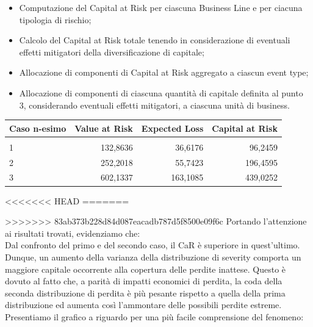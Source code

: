 \documentclass[titlepage]{article}
\begin{document}
\begin{itemize}
\begin{itemize}
	\item 	Computazione del Capital at Risk per ciascuna Business Line e per ciacuna tipologia di rischio;
	\item Calcolo del Capital at Risk totale tenendo in considerazione di eventuali effetti mitigatori della diversificazione di capitale;
	\item 	Allocazione di componenti di Capital at Risk aggregato a ciascun event type;
	\item 	Allocazione di componenti di ciascuna quantità di capitale definita al punto 3, considerando eventuali effetti mitigatori, a ciascuna unità di business.
\end{itemize}
\begin{table}[htbp]
	\centering
	\begin{tabular}{l|rrr}
		Caso n-esimo & Value at Risk & Expected Loss& Capital at Risk \\\hline
		\\
		1 & 132,8636&36,6176&96,2459 \\
		2 & 252,2018 &55,7423&196,4595\\
		3 & 602,1337 &163,1085&439,0252
	\end{tabular}
\end{table}
<<<<<<< HEAD
\newpage
=======

>>>>>>> 83ab373b228d84d087eacadb787d5f8500e09f6c
Portando l’attenzione ai risultati trovati, evidenziamo che:
\\

		Dal confronto del primo e del secondo caso, il CaR è superiore in quest’ultimo. Dunque, un aumento della varianza della distribuzione di severity comporta un maggiore capitale occorrente alla copertura delle perdite inattese. Questo è dovuto al fatto che, a parità di impatti economici di perdita, la coda della seconda distribuzione di perdita è più pesante rispetto a quella della prima distribuzione ed aumenta così l’ammontare delle possibili perdite estreme. Presentiamo il grafico a riguardo per una più facile comprensione del fenomeno:




\end{itemize}
\end{document}
